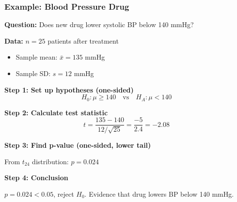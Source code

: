 \documentclass{beamer}
\begin{document}
\begin{frame}
\frametitle{Example: Blood Pressure Drug}
\textbf{Question:} Does new drug lower systolic BP below 140 mmHg?

\vspace{0.1cm}
\textbf{Data:} $n = 25$ patients after treatment
\begin{itemize}
\item Sample mean: $\bar{x} = 135$ mmHg
\item Sample SD: $s = 12$ mmHg
\end{itemize}

\vspace{0.15cm}
\textbf{Step 1: Set up hypotheses (one-sided)}
$$H_0: \mu \geq 140 \quad \text{vs} \quad H_A: \mu < 140$$

\vspace{0.1cm}
\textbf{Step 2: Calculate test statistic}
$$t = \frac{135 - 140}{12/\sqrt{25}} = \frac{-5}{2.4} = -2.08$$

\vspace{0.1cm}
\textbf{Step 3: Find p-value (one-sided, lower tail)}

From $t_{24}$ distribution: $p = 0.024$

\vspace{0.1cm}
\textbf{Step 4: Conclusion}

$p = 0.024 < 0.05$, reject $H_0$. Evidence that drug lowers BP below 140 mmHg.
\end{frame}
\end{document}
